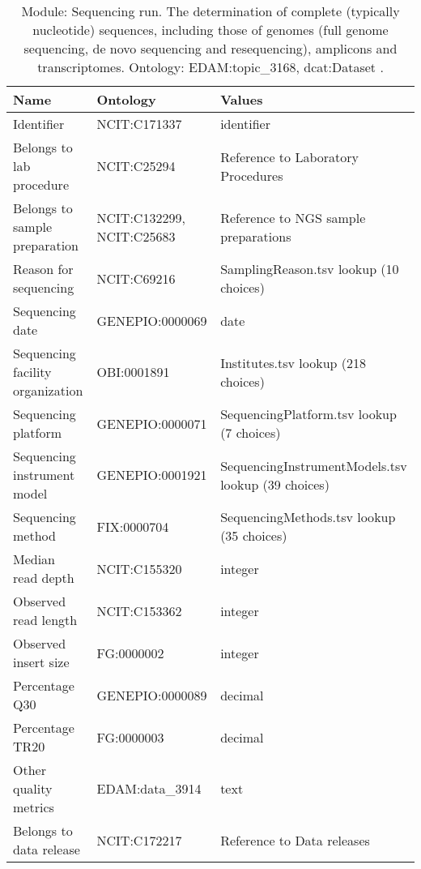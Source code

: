 \documentclass{article}
\begin{document}
\begin{table}[htb]
\begin{tabular}{lll}
Name & Ontology & Values \\
\hline
Identifier & NCIT:C171337  & identifier \\
Belongs to lab procedure & NCIT:C25294  & Reference to Laboratory Procedures \\
Belongs to sample preparation & NCIT:C132299, NCIT:C25683  & Reference to NGS sample preparations \\
Reason for sequencing & NCIT:C69216  & SamplingReason.tsv lookup (10 choices) \\
Sequencing date & GENEPIO:0000069  & date \\
Sequencing facility organization & OBI:0001891  & Institutes.tsv lookup (218 choices) \\
Sequencing platform & GENEPIO:0000071  & SequencingPlatform.tsv lookup (7 choices) \\
Sequencing instrument model & GENEPIO:0001921  & SequencingInstrumentModels.tsv lookup (39 choices) \\
Sequencing method & FIX:0000704  & SequencingMethods.tsv lookup (35 choices) \\
Median read depth & NCIT:C155320  & integer \\
Observed read length & NCIT:C153362  & integer \\
Observed insert size & FG:0000002  & integer \\
Percentage Q30 & GENEPIO:0000089  & decimal \\
Percentage TR20 & FG:0000003  & decimal \\
Other quality metrics & EDAM:data\_3914  & text \\
Belongs to data release & NCIT:C172217  & Reference to Data releases \\
\hline
\end{tabular}
\caption[Module: Sequencing run]{\label{table:table10} Module: Sequencing run. The determination of complete (typically nucleotide) sequences, including those of genomes (full genome sequencing, de novo sequencing and resequencing), amplicons and transcriptomes. Ontology: EDAM:topic\_3168, dcat:Dataset . }
\end{table}
\end{document}
